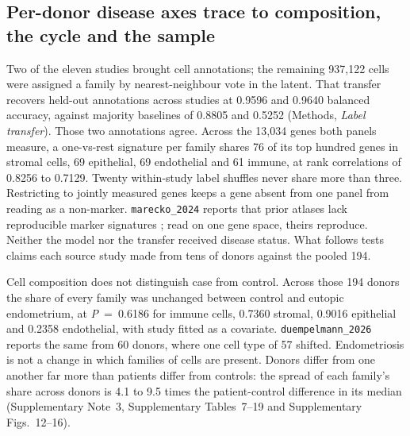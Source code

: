 \subsection*{Per-donor disease axes trace to composition, the cycle and the sample}

Two of the eleven studies brought cell annotations; the remaining 937,122
cells were assigned a family by nearest-neighbour vote in the latent. That
transfer recovers held-out annotations across studies at 0.9596 and 0.9640
balanced accuracy, against majority baselines of 0.8805 and 0.5252
(Methods, \emph{Label transfer}). Those two annotations agree. Across the
13,034 genes both panels measure, a one-vs-rest signature per family shares
76 of its top hundred genes in stromal cells, 69 epithelial, 69 endothelial
and 61 immune, at rank correlations of 0.8256 to 0.7129. Twenty within-study
label shuffles never share more than three. Restricting to jointly measured
genes keeps a gene absent from one panel from reading as a non-marker.
\texttt{marecko\_2024} reports that prior atlases lack reproducible marker
signatures \citep{mareckova2024heca}; read on one gene space, theirs
reproduce. Neither the model nor the transfer
received disease status. What follows tests claims each source study made
from tens of donors against the pooled 194.

Cell composition does not distinguish case from control. Across those 194
donors the share of every family was unchanged between control and eutopic
endometrium, at \textit{P}~=~0.6186 for immune cells, 0.7360 stromal, 0.9016
epithelial and 0.2358 endothelial, with study fitted as a covariate.
\texttt{duempelmann\_2026} reports the same from 60 donors, where one cell
type of 57 shifted. Endometriosis is not a change in which families of
cells are present. Donors differ from one another far more than patients
differ from controls: the spread of each family's share across donors is
4.1 to 9.5 times the patient-control difference in its median
(Supplementary Note~3, Supplementary Tables~7--19 and Supplementary
Figs.~12--16).

